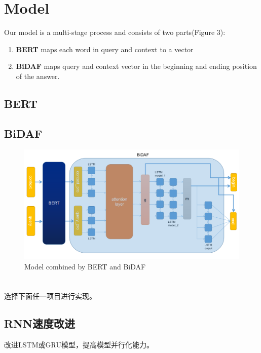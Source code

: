 \documentclass{article}
\begin{document}
\section{Model}
\noindent Our model is a multi-stage process and consists of two parts(Figure 3):\\
\begin{enumerate}
	\item \textbf{BERT} maps each word in query and context to a vector  
	\item \textbf{BiDAF} maps query and context vector in the beginning and ending position of the answer.
\end{enumerate}
\subsection{BERT}
\subsection{BiDAF}
\begin{figure}[h]
	\centering
	\includegraphics[scale=0.3 ]{Model.png}
	\caption{Model combined by BERT and BiDAF}
\end{figure}
\section{}

选择下面任一项目进行实现。

\subsection{RNN速度改进}
改进LSTM或GRU模型，提高模型并行化能力。
\end{document}
